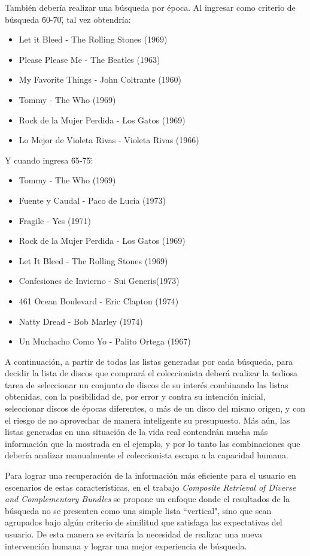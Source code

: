 También debería realizar una búsqueda por época. Al ingresar como criterio de búsqueda \"60-70\", tal vez obtendría:
\begin{itemize}
	\item Let it Bleed - The Rolling Stones (1969)
	\item Please Please Me - The Beatles (1963)
	\item My Favorite Things - John Coltrante (1960)
	\item Tommy - The Who (1969)
	\item Rock de la Mujer Perdida - Los Gatos (1969)
	\item Lo Mejor de Violeta Rivas - Violeta Rivas (1966)
\end{itemize}

Y cuando ingresa \"65-75\":
\begin{itemize}
	\item Tommy - The Who (1969)
	\item Fuente y Caudal - Paco de Lucía (1973)
	\item Fragile - Yes (1971)
	\item Rock de la Mujer Perdida - Los Gatos (1969)
	\item Let It Bleed - The Rolling Stones (1969)
	\item Confesiones de Invierno - Sui Generis(1973)
	\item 461 Ocean Boulevard - Eric Clapton (1974)
	\item Natty Dread - Bob Marley (1974)
	\item Un Muchacho Como Yo - Palito Ortega (1967)
\end{itemize}


A continuación, a partir de todas las listas generadas por cada búsqueda, para decidir la lista de discos que comprará el coleccionista deberá realizar la tediosa tarea de seleccionar un conjunto de discos de su interés combinando las listas obtenidas, con la posibilidad de, por error y contra su intención inicial, seleccionar discos de  épocas diferentes, o más de un disco del mismo origen, y con el riesgo de no aprovechar de manera inteligente su presupuesto. Más aún, las listas generadas en una situación de la vida real contendrán mucha más información que la mostrada en el ejemplo, y por lo tanto las combinaciones que debería analizar manualmente el coleccionista escapa a la capacidad humana. 

Para lograr una recuperación de la información más eficiente para el usuario en escenarios de estas características, en el trabajo {\em Composite Retrieval of Diverse and Complementary Bundles} \cite{compositeRetrival} se propone un enfoque donde el resultados de la búsqueda no se presenten como una simple lista ``vertical", sino que sean agrupados bajo algún criterio de similitud que satisfaga las expectativas del usuario. De esta manera se evitaría la necesidad de realizar una nueva intervención humana y lograr una mejor experiencia de búsqueda.

